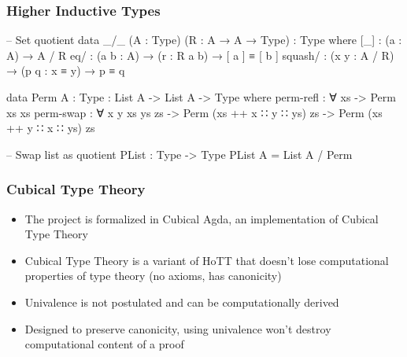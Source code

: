 \documentclass[9pt]{beamer}
\begin{document}
\begin{frame}[fragile]
\frametitle{Higher Inductive Types}

\begin{code}
-- Set quotient
data _/_ (A : Type) (R : A → A → Type) : Type where
  [_] : (a : A) → A / R
  eq/ : (a b : A) → (r : R a b) → [ a ] ≡ [ b ]
  squash/ : (x y : A / R) → (p q : x ≡ y) → p ≡ q

data Perm {A : Type} : List A -> List A -> Type where
  perm-refl : ∀ {xs} -> Perm xs xs
  perm-swap : ∀ {x y xs ys zs}
    -> Perm (xs ++ x ∷ y ∷ ys) zs
    -> Perm (xs ++ y ∷ x ∷ ys) zs

-- Swap list as quotient
PList : Type -> Type
PList A = List A / Perm
\end{code}

\end{frame}

\begin{frame}
\frametitle{Cubical Type Theory}

\begin{itemize}

  \item The project is formalized in \alert{Cubical Agda}, an implementation of Cubical Type Theory
  \item Cubical Type Theory is a variant of HoTT that doesn't lose \alert{computational properties} of type theory
        (no axioms, has \alert{canonicity})
  \item Univalence is not postulated and can be computationally derived
  \item Designed to preserve \alert{canonicity}, using univalence won't destroy computational content of a proof

\end{itemize}


\end{frame}
\end{document}
